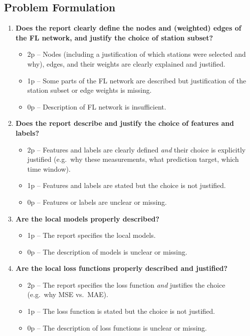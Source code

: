 \documentclass{article}
\begin{document}
	\subsection{Problem Formulation}
   		\begin{enumerate}[resume]
		\item \textbf{Does the report clearly define the nodes and (weighted) edges of the FL network, and justify the choice of station subset?}
		\begin{itemize}
			\item 2p – Nodes (including a justification of which stations were selected and why), edges, and their weights are clearly explained and justified.
			\item 1p – Some parts of the FL network are described but justification of the station subset or edge weights is missing.
			\item 0p – Description of FL network is insufficient.
		\end{itemize}

		\item \textbf{Does the report describe and justify the choice of features and labels?}
		\begin{itemize}
			\item 2p – Features and labels are clearly defined \emph{and} their choice is explicitly justified (e.g.\ why these measurements, what prediction target, which time window).
			\item 1p – Features and labels are stated but the choice is not justified.
			\item 0p – Features or labels are unclear or missing.
		\end{itemize}

		\item \textbf{Are the local models properly described?}
		\begin{itemize}
			\item 1p – The report specifies the local models.
			\item 0p – The description of models is unclear or missing.
		\end{itemize}

		\item \textbf{Are the local loss functions properly described and justified?}
		\begin{itemize}
			\item 2p – The report specifies the loss function \emph{and} justifies the choice (e.g.\ why MSE vs.\ MAE).
			\item 1p – The loss function is stated but the choice is not justified.
			\item 0p – The description of loss functions is unclear or missing.
		\end{itemize}
	\end{enumerate}
	
\end{document}
